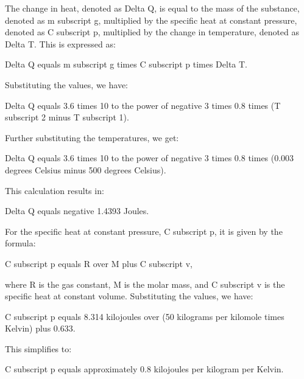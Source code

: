 The change in heat, denoted as Delta Q, is equal to the mass of the substance, denoted as m subscript g, multiplied by the specific heat at constant pressure, denoted as C subscript p, multiplied by the change in temperature, denoted as Delta T. This is expressed as:

Delta Q equals m subscript g times C subscript p times Delta T.

Substituting the values, we have:

Delta Q equals 3.6 times 10 to the power of negative 3 times 0.8 times (T subscript 2 minus T subscript 1).

Further substituting the temperatures, we get:

Delta Q equals 3.6 times 10 to the power of negative 3 times 0.8 times (0.003 degrees Celsius minus 500 degrees Celsius).

This calculation results in:

Delta Q equals negative 1.4393 Joules.

For the specific heat at constant pressure, C subscript p, it is given by the formula:

C subscript p equals R over M plus C subscript v,

where R is the gas constant, M is the molar mass, and C subscript v is the specific heat at constant volume. Substituting the values, we have:

C subscript p equals 8.314 kilojoules over (50 kilograms per kilomole times Kelvin) plus 0.633.

This simplifies to:

C subscript p equals approximately 0.8 kilojoules per kilogram per Kelvin.